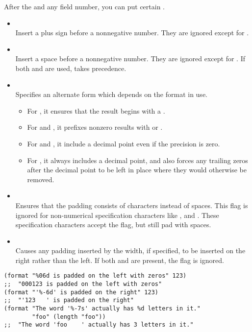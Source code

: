 After the \argument{\%} and any field number, you can put certain .
\begin{itemize}
\item \argument{+}\\
  Insert a plus sign before a nonnegative number.
  They are ignored except for .
\item {}\\
  Insert a space before a nonnegative number.
  They are ignored except for .
  If both \argument{+} and  are used, \argument{+} takes precedence.  
\item \argument{\#}\\
  Specifies an alternate form which depends on the format in use.
  \begin{itemize}
  \item For , it ensures that the result begins with a . 
  \item For  and , it prefixes nonzero results with  or .
  \item  For  and , it include a decimal point even if the precision is zero.
  \item  For , it always includes a decimal point, and also forces any trailing zeros after the decimal point to be left in place where they would otherwise be removed.
  \end{itemize}
\item {}\\
  Ensures that the padding consists of  characters instead of spaces.
  This flag is ignored for non-numerical specification characters like ,  and .
  These specification characters accept the  flag, but still pad with spaces.
\item \argument{-}\\
  Causes any padding inserted by the width, if specified, to be inserted on the right rather than the left.
  If both \argument{-} and  are present, the  flag is ignored.
\end{itemize}


\begin{lstlisting}
(format "%06d is padded on the left with zeros" 123)
;;  "000123 is padded on the left with zeros"
(format "'%-6d' is padded on the right" 123)
;;  "'123   ' is padded on the right"
(format "The word '%-7s' actually has %d letters in it."
        "foo" (length "foo"))
;;  "The word 'foo    ' actually has 3 letters in it."
\end{lstlisting}


